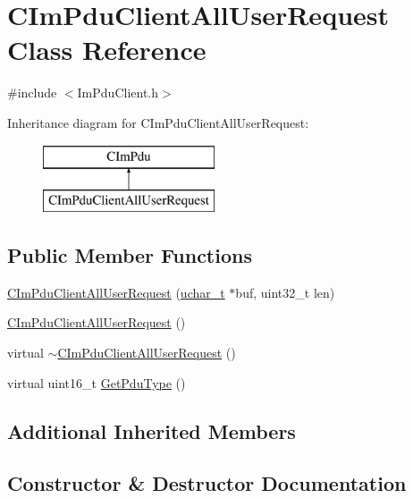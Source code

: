 \hypertarget{class_c_im_pdu_client_all_user_request}{}\section{C\+Im\+Pdu\+Client\+All\+User\+Request Class Reference}
\label{class_c_im_pdu_client_all_user_request}


{\ttfamily \#include $<$Im\+Pdu\+Client.\+h$>$}

Inheritance diagram for C\+Im\+Pdu\+Client\+All\+User\+Request\+:\begin{figure}[H]
\begin{center}
\leavevmode
\includegraphics[height=2.000000cm]{class_c_im_pdu_client_all_user_request}
\end{center}
\end{figure}
\subsection*{Public Member Functions}
\begin{DoxyCompactItemize}
\item 
\hyperlink{class_c_im_pdu_client_all_user_request_a6ae8ce29075917b442e67e6471dcbae1}{C\+Im\+Pdu\+Client\+All\+User\+Request} (\hyperlink{base_2ostype_8h_a124ea0f8f4a23a0a286b5582137f0b8d}{uchar\+\_\+t} $\ast$buf, uint32\+\_\+t len)
\item 
\hyperlink{class_c_im_pdu_client_all_user_request_a1bb0a1a128ba385da4982851555080c2}{C\+Im\+Pdu\+Client\+All\+User\+Request} ()
\item 
virtual \hyperlink{class_c_im_pdu_client_all_user_request_a6dc780e7bcee2abefe710bc01c9b2605}{$\sim$\+C\+Im\+Pdu\+Client\+All\+User\+Request} ()
\item 
virtual uint16\+\_\+t \hyperlink{class_c_im_pdu_client_all_user_request_a56387f35749c384b0c949df08994403f}{Get\+Pdu\+Type} ()
\end{DoxyCompactItemize}
\subsection*{Additional Inherited Members}


\subsection{Constructor \& Destructor Documentation}
\hypertarget{class_c_im_pdu_client_all_user_request_a6ae8ce29075917b442e67e6471dcbae1}{}
